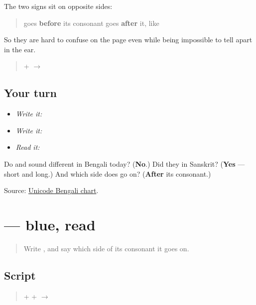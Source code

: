 The two signs sit on opposite sides:

\begin{quote}
\textbf{} goes \textbf{before} its consonant \textbf{} goes \textbf{after} it, like \textbf{}
\end{quote}

So they are hard to confuse on the page even while being impossible to tell apart in the ear.

\begin{quote}
\textbf{} + \textbf{} $\to$ \textbf{}
\end{quote}

\subsection*{Your turn}
\begin{itemize}
\raggedright
  \item \emph{Write it:} 
  \item \emph{Write it:} 
  \item \emph{Read it:} 
\end{itemize}

\begin{tcolorbox}[breakable,colback=teal!4,colframe=teal!35!black,title={Before you move on}]
Do \textbf{} and \textbf{} sound different in Bengali today? (\textbf{No}.) Did they in Sanskrit? (\textbf{Yes} — short and long.) And which side does \textbf{} go on? (\textbf{After} its consonant.)

Source: \href{https://www.unicode.org/charts/PDF/U0980.pdf}{Unicode Bengali chart}.
\end{tcolorbox}
\section[nīl]{ — blue, read}

\label{lesson:BN-W04-nil-read}



\begin{quote}
Write \textbf{}, and say which side of its consonant it goes on.
\end{quote}

\subsection*{Script}
\begin{quote}
\textbf{} + \textbf{} + \textbf{} $\to$ \textbf{}
\end{quote}

